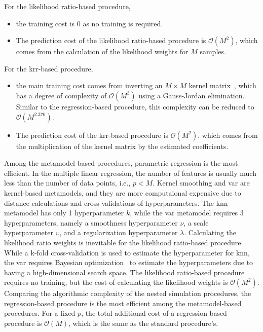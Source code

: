 For the likelihood ratio-based procedure, 
\begin{itemize}
    \item the training cost is $0$ as no training is required.
    \item The prediction cost of the likelihood ratio-based procedure is $\mathcal{O}(M^2)$, which comes from the calculation of the likelihood weights for $M$ samples.
\end{itemize}
For the \gls{krr}-based procedure, 
\begin{itemize}
    \item the main training cost comes from inverting an $M \times M$ kernel matrix~\citep{scholkopf2002learning}, which has a degree of complexity of $\mathcal{O}(M^3)$ using a Gauss-Jordan elimination.
          Similar to the regression-based procedure, this complexity can be reduced to $\mathcal{O}(M^{2.376})$.
    \item The prediction cost of the \gls{krr}-based procedure is $\mathcal{O}(M^2)$, which comes from the multiplication of the kernel matrix by the estimated coefficients.
\end{itemize}
Among the metamodel-based procedures, parametric regression is the most efficient.
In the multiple linear regression, the number of features is usually much less than the number of data points, i.e., $p<M$. 
Kernel smoothing and \gls{var} are kernel-based metamodels, and they are more computaional expensive due to distance calculations and cross-validations of hyperparameters. 
The \gls{knn} metamodel has only 1 hyperparameter $k$, while the \gls{var} metamodel requires 3 hyperparameters, namely a smoothness hyperparameter $\nu$, a scale hyperparameter $\upsilon$, and a regularization hyperparameter $\lambda$.
Calculating the likelihood ratio weights is inevitable for the likelihood ratio-based procedure. 
While a k-fold cross-validation is used to estimate the hyperparameter for \gls{knn}, the \gls{var} requires Bayesian optimization~\citep{shahriari2015taking} to estimate the hyperparameters due to having a high-dimensional search space.
The likelihood ratio-based procedure requires no training, but the cost of calculating the likelihood weights is $\mathcal{O}(M^2)$.
Comparing the algorithmic complexity of the nested simulation procedures, the regression-based procedure is the most efficient among the metamodel-based procedures.
For a fixed $p$, the total additional cost of a regression-based procedure is $\mathcal{O}(M)$, which is the same as the standard procedure's.

